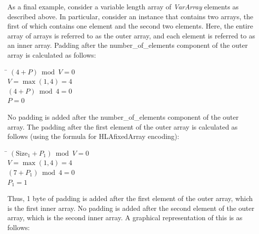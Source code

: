 As a final example, consider a variable length array of \textit{VarArray} elements as described above. In particular, consider an instance that contains two arrays, the first of which contains one element and the second two elements. Here, the entire array of arrays is referred to as the outer array, and each element is referred to as an inner array. Padding after the number\_of\_elements component of the outer array is calculated as follows:

\begin{tabbing}
    \hspace{18pt}\=\kill
    \> $(4+P) \bmod V = 0$\\
    \> $V = \max(1,4) = 4$\\
    \> $(4+P) \bmod 4 = 0$\\
    \> $P=0$
\end{tabbing}

No padding is added after the number\_of\_elements component of the outer array. The padding after the first element of the outer array is calculated as follows (using the formula for HLAfixedArray encoding):

\newpage
\begin{tabbing}
    \hspace{18pt}\=\kill
    \> $(\mathrm{Size}_1 + P_1) \bmod V = 0$\\
    \> $V = \max(1,4) = 4$\\
    \> $(7+P_1) \bmod 4 = 0$\\
    \> $P_1 = 1$
\end{tabbing}

Thus, 1 byte of padding is added after the first element of the outer array, which is the first inner array. No padding is added after the second element of the outer array, which is the second inner array. A graphical representation of this is as follows:

